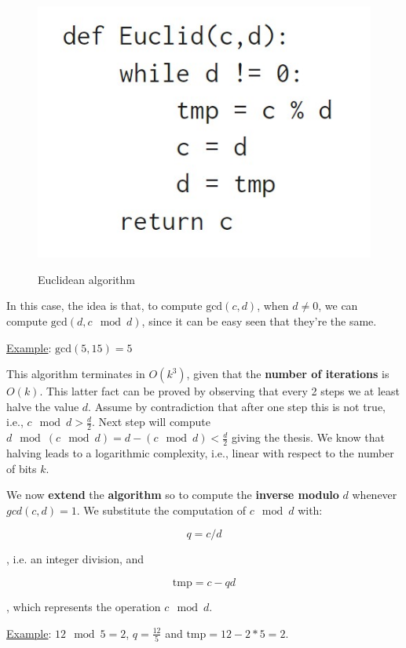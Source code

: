 \begin{figure}[h!]
        \centering
        \includegraphics[scale = 0.9]{img/eu1.jpg}
        \label{eu1}
        \caption{Euclidean algorithm}
\end{figure}

In this case, the idea is that, to compute $\text{gcd}(c,d)$, when $d \neq 0$, we can compute $\text{gcd}(d,c \mod d)$, since it can be easy seen that they're the same.

\underline{Example}: $\text{gcd}(5,15) = 5$

This algorithm terminates in $O(k^3)$, given that the \textbf{number of iterations} is $O(k)$. This latter fact can be proved by observing that every 2 steps we at least halve the value $d$. Assume by contradiction that after one step this is not true, i.e., $c \mod d > \frac{d}{2}$. Next step will compute $d \mod (c \mod d) = d - (c \mod d) < \frac{d}{2}$ giving the thesis. We know that halving leads to a logarithmic complexity, i.e., linear with respect to the number of bits $k$.

We now \textbf{extend} the \textbf{algorithm} so to compute the \textbf{inverse modulo} $d$ whenever $gcd(c,d)=1$. We substitute the computation of $c\mod d$ with:

$$
q = c/d
$$

, i.e. an integer division, and

$$
\text{tmp} = c - qd
$$

, which represents the operation $c \mod d$.

\underline{Example}: $12 \mod 5 = 2$, $q = \frac{12}{5}$ and $\text{tmp} = 12 - 2*5 = 2$.

